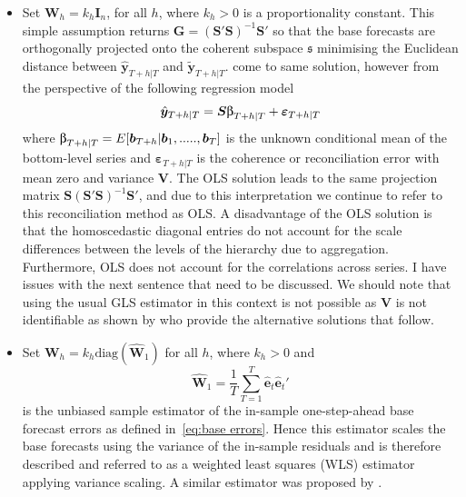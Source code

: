 \documentclass[graybox]{svmult}
\begin{document}
\begin{itemize}
    \item Set ${\bm{W}}_{h}=k_h\bm{I}_n$, for all $h$, where $k_{h} > 0$ is a proportionality constant. This simple assumption returns $\bm{G}=(\bm{S}'\bm{S})^{-1}\bm{S}'$ so that the base forecasts are orthogonally projected onto the coherent subspace $\mathfrak{s}$ minimising the Euclidean distance between $\hat{\bm{y}}_{T+h|T}$ and $\tilde{\bm{y}}_{T+h|T}$.  \cite{HynEtAl2011} come to same solution, however from the perspective of the following regression model \begin{equation*}\hat{\bm{y}}_{T+h|T} = \bm{S\ubeta}_{T+h|T} + \bm{\varepsilon}_{T+h|T} \end{equation*} where $\bm{\ubeta}_{T+h|T}=E[\bm{b}_{T+h}|\bm{b}_1,.....,\bm{b}_T]$ is the unknown conditional mean of the bottom-level series and $\bm{\varepsilon}_{T+h|T}$ is the coherence or reconciliation error with mean zero and variance $\bm{V}$. The OLS solution leads to the same projection matrix $\bm{S}(\bm{S}'\bm{S})^{-1}\bm{S}'$, and due to this interpretation we continue to refer to this reconciliation method as OLS. A disadvantage of the OLS solution is that the homoscedastic diagonal entries do not account for the scale differences between the levels of the hierarchy due to aggregation.  Furthermore, OLS does not account for the correlations across series.  {\color{red} I have issues with the next sentence that need to be discussed}.  We should note that using the usual GLS estimator in this context is not possible as $\bm{V}$ is not identifiable as shown by \cite{WicEtAl2019} who provide the alternative solutions that follow.

    \item Set ${\bm{W}}_{h}=k_{h}\text{diag}(\hat{\bm{W}}_{1})$ for all $h$, where $k_{h} > 0$ and
        $$
        \hat{\bm{W}}_{1} = \frac{1}{T}\sum_{T=1}^{T} \hat{\bm{e}}_{t}\hat{\bm{e}}_{t}'
        $$
        is the unbiased sample estimator of the in-sample one-step-ahead base forecast errors as defined in~\eqref{eq:base errors}. Hence this estimator scales the base forecasts using the variance of the in-sample residuals and is therefore described and referred to as a weighted least squares (WLS) estimator applying variance scaling. A similar estimator was proposed by \cite{Hyndman2016}.


\end{itemize}
\end{document}
